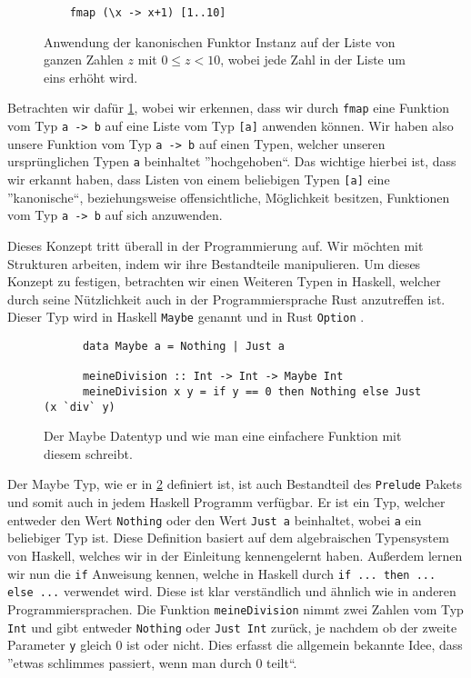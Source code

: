 \documentclass{hhuarticle}
\theoremstyle{definition}
\theoremstyle{theorem}
\begin{document}
  \begin{figure}[h]
    \begin{verbatim}
    fmap (\x -> x+1) [1..10]
    \end{verbatim}
    \caption{Anwendung der kanonischen Funktor Instanz auf der Liste von ganzen Zahlen $z$ mit $0\le z < 10$, wobei jede Zahl in der Liste um eins erhöht wird.}%
    \label{fig:fmapExample}
  \end{figure}

  Betrachten wir dafür \cref{fig:fmapExample}, wobei wir erkennen,
  dass wir durch \verb|fmap| eine Funktion vom Typ \verb|a -> b| auf
  eine Liste vom Typ \verb|[a]| anwenden können. Wir haben also unsere
  Funktion vom Typ \verb|a -> b| auf einen Typen, welcher unseren
  ursprünglichen Typen \verb|a| beinhaltet ''hochgehoben``.
  Das wichtige hierbei ist, dass wir erkannt haben, dass Listen von einem
  beliebigen Typen \verb|[a]| eine ''kanonische``, beziehungsweise offensichtliche,
  Möglichkeit besitzen, Funktionen vom Typ \verb|a -> b| auf sich anzuwenden.

  Dieses Konzept tritt überall in der Programmierung auf. Wir möchten
  mit Strukturen arbeiten, indem wir ihre Bestandteile manipulieren.
  Um dieses Konzept zu festigen, betrachten wir einen Weiteren Typen in
  Haskell, welcher durch seine Nützlichkeit auch in der Programmiersprache
  Rust anzutreffen ist. Dieser Typ wird in Haskell \verb|Maybe| genannt
  und in Rust \verb|Option| \cite{rustOption}.

  \begin{figure}[h]
    \begin{verbatim}
      data Maybe a = Nothing | Just a

      meineDivision :: Int -> Int -> Maybe Int
      meineDivision x y = if y == 0 then Nothing else Just (x `div` y)
    \end{verbatim}
    \caption{Der Maybe Datentyp und wie man eine einfachere Funktion mit diesem schreibt.}%
    \label{fig:maybeType}
  \end{figure}

  Der Maybe Typ, wie er in \cref{fig:maybeType} definiert ist, ist auch
  Bestandteil des \verb|Prelude| Pakets und somit auch in jedem Haskell
  Programm verfügbar. Er ist ein Typ, welcher entweder den Wert \verb|Nothing|
  oder den Wert \verb|Just a| beinhaltet, wobei \verb|a| ein beliebiger Typ ist.
  Diese Definition basiert auf dem algebraischen Typensystem von Haskell,
  welches wir in der Einleitung kennengelernt haben.
  Außerdem lernen wir nun die \verb|if| Anweisung kennen, welche
  in Haskell durch \verb|if ... then ... else ...| verwendet wird.
  Diese ist klar verständlich und ähnlich wie in anderen Programmiersprachen.
  Die Funktion \verb|meineDivision| nimmt zwei Zahlen vom Typ \verb|Int| und
  gibt entweder \verb|Nothing| oder \verb|Just Int| zurück,
  je nachdem ob der zweite Parameter \verb|y| gleich $0$ ist oder nicht.
  Dies erfasst die allgemein bekannte Idee, dass ''etwas schlimmes passiert,
  wenn man durch $0$ teilt``.
\end{document}
